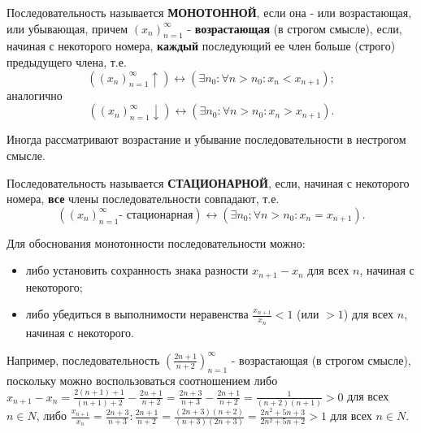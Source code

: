 \Large

{ 

  \indent Последовательность называется \textbf{МОНОТОННОЙ}, если она -
  или возрастающая, или убывающая, причем $(x_n)_{n=1}^{\infty}$ -
  \textbf{возрастающая} (в строгом смысле), если, начиная с некоторого
  номера, \textbf{каждый} последующий ее член больше (строго)
  предыдущего члена, т.е.
  \begin{equation*}
    ((x_n)_{n=1}^{\infty} \uparrow) \leftrightarrow
    (\exists n_0 : \forall n > n_0 : x_n < x_{n+1});
  \end{equation*}
  аналогично
  \begin{equation*}
    ((x_n)_{n=1}^{\infty} \downarrow) \leftrightarrow
    (\exists n_0 : \forall n > n_0 : x_n > x_{n+1}).
  \end{equation*}

  Иногда рассматривают возрастание и убывание
  последовательности в нестрогом смысле.

  Последовательность называется \textbf{СТАЦИОНАРНОЙ}, если,
  начиная с некоторого номера, \textbf{все} члены последовательности
  совпадают, т.е.
  \begin{equation*}
    ((x_n)_{n=1}^{\infty} \text{- стационарная}) \leftrightarrow
    (\exists n_0; \forall n > n_0 : x_n = x_{n + 1}).
  \end{equation*}

  Для обоснования монотонности последовательности можно:
  \begin{itemize}
    \item либо установить сохранность знака разности $x_{n+1} - x_n$ для всех $n$, начиная с некоторого;
    \item  либо убедиться в выполнимости неравенства $\frac{x_{n+1}}{x_n} < 1$ (или $>1$)
    для всех $n$, начиная с некоторого.
  \end{itemize}
}
Например, последовательность $(\frac{2n+1}{n+2})_{n=1}^{\infty}$ - возрастающая
(в строгом смысле), поскольку можно воспользоваться соотношением
либо 
$x_{n+1} - x_n = 
\frac{2(n+1)+1}{(n+1)+2} - \frac{2n+1}{n+2} = 
\frac{2n+3}{n+3} - \frac{2n+1}{n+2} = 
\frac{1}{(n+2)(n+1)} > 0$ для всех $n \in N$,
либо 
$\frac{x_{n+1}}{x_n} = 
\frac{2n+3}{n+3} : \frac{2n+1}{n+2} =
\frac{(2n+3)(n+2)}{(n+3)(2n+3)} =
\frac{2n^2+5n+3}{2n^2+5n+2} > 1$ для всех
$n \in N$.
